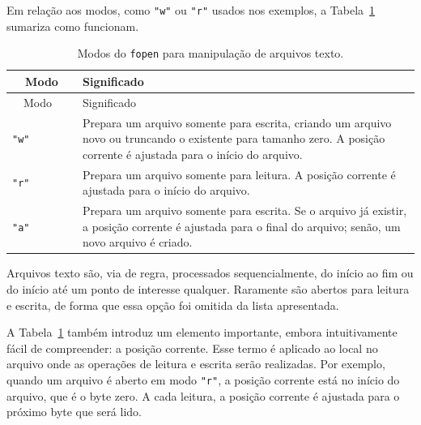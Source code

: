 \documentclass[
  11pt,
  a4paper,
]{scrbook}
\begin{document}
Em relação aos modos, como \texttt{"w"} ou \texttt{"r"} usados nos
exemplos, a Tabela~\ref{tbl-modos-arquivo-texto} sumariza como
funcionam.

\begin{longtable}[]{@{}
  >{\centering\arraybackslash}p{}
  >{\raggedright\arraybackslash}p{}@{}}
\caption{Modos do \texttt{fopen} para manipulação de arquivos
texto.}\label{tbl-modos-arquivo-texto}\tabularnewline
\toprule\noalign{}
\begin{minipage}[b]{\linewidth}\centering
{~~Modo~~}
\end{minipage} & \begin{minipage}[b]{\linewidth}\raggedright
Significado
\end{minipage} \\
\midrule\noalign{}
\endfirsthead
\toprule\noalign{}
\begin{minipage}[b]{\linewidth}\centering
{~~Modo~~}
\end{minipage} & \begin{minipage}[b]{\linewidth}\raggedright
Significado
\end{minipage} \\
\midrule\noalign{}
\endhead
\bottomrule\noalign{}
\endlastfoot
\texttt{"w"} & Prepara um arquivo somente para escrita, criando um
arquivo novo ou truncando o existente para tamanho zero. A posição
corrente é ajustada para o início do arquivo. \\
\texttt{"r"} & Prepara um arquivo somente para leitura. A posição
corrente é ajustada para o início do arquivo. \\
\texttt{"a"} & Prepara um arquivo somente para escrita. Se o arquivo já
existir, a posição corrente é ajustada para o final do arquivo; senão,
um novo arquivo é criado. \\
\end{longtable}

Arquivos texto são, via de regra, processados sequencialmente, do início
ao fim ou do início até um ponto de interesse qualquer. Raramente são
abertos para leitura e escrita, de forma que essa opção foi omitida da
lista apresentada.

A Tabela~\ref{tbl-modos-arquivo-texto} também introduz um elemento
importante, embora intuitivamente fácil de compreender: a posição
corrente. Esse termo é aplicado ao local no arquivo onde as operações de
leitura e escrita serão realizadas. Por exemplo, quando um arquivo é
aberto em modo \texttt{"r"}, a posição corrente está no início do
arquivo, que é o byte zero. A cada leitura, a posição corrente é
ajustada para o próximo byte que será lido.
\end{document}
